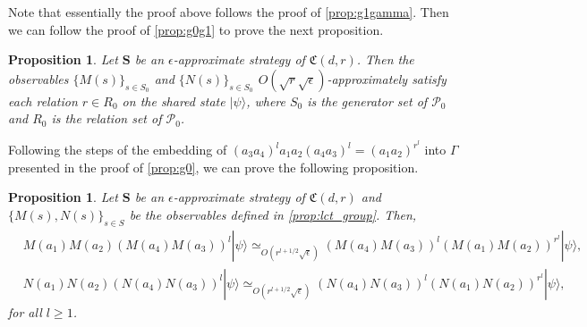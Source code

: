 \documentclass[11pt,letterpaper]{article}
\newcommand{\ket}[1]{|#1\rangle}
\newcommand{\1}{\mathbb{1}}
\newcommand{\Pg}{\mathcal{P}}
\newcommand{\fC}{\mathfrak{C}}
\newcommand{\bS}{\pmb{S}}
\newcommand{\ep}{\epsilon}
\newcommand{\se}{\sqrt{\epsilon}}
\newcommand{\sr}{\sqrt{r}}
\newcommand{\appd}[1]{\simeq_{#1}}
\newtheorem{proposition}[theorem]{Proposition}
\theoremstyle{definition}
\begin{document}
Note that essentially the proof above follows the proof of 
\cref{prop:g1gamma}. Then we can follow the proof of \cref{prop:g0g1}
to prove the next proposition.
\begin{proposition}
    \label{prop:lct_pg0}
    Let $\bS$ be an $\ep$-approximate strategy of $\fC(d,r)$.
	Then the observables $\{ M(s) \}_{s \in S_0}$ and 
	$\{N(s)\}_{s \in S_0}$ $O(\sr \se)$-approximately satisfy
	each relation $r \in R_0$ on the shared state $\ket{\psi}$, 
	where $S_0$ is the generator set of $\Pg_0$
    and $R_0$ is the relation set of $\Pg_0$.	
\end{proposition}
Following the steps of the embedding of $(a_3a_4)^l a_1a_2(a_4a_3)^l = (a_1a_2)^{r^l}$ into $\Gamma$ presented in
the proof of \cref{prop:g0},
we can prove the following proposition.
\begin{proposition}
\label{prop:lct_adv}
Let $\bS$ be an $\ep$-approximate strategy of $\fC(d,r)$ and $\{M(s), N(s)\}_{s \in S}$ be the observables defined in 
\cref{prop:lct_group}. 
Then,
\begin{align}
	&M(a_1)M(a_2) (M(a_4)M(a_3))^l \ket{\psi}\appd{O(r^{l+1/2} \se)} (M(a_4)M(a_3))^l (M(a_1)M(a_2))^{r^l} \ket{\psi}, \\
	&N(a_1)N(a_2) (N(a_4)N(a_3))^l \ket{\psi}\appd{O(r^{l+1/2} \se)} (N(a_4)N(a_3))^l (N(a_1)N(a_2))^{r^l} \ket{\psi}, 
\end{align}
for all $l \geq 1$.
\end{proposition}
\end{document}
